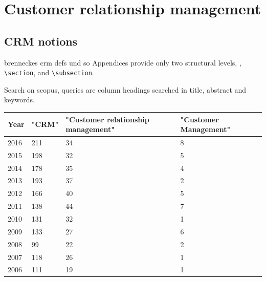\section{Customer relationship management}\label{sec:appendix01}

\subsection{CRM notions}
\label{app:crm}
brenneckes crm defs und so 
Appendices provide only two structural levels, \viz, \texttt{\textbackslash section}, and \texttt{\textbackslash subsection}.

Search on scopus, queries are column headings searched in title, abstract and keywords. 

\begin{table}[caption={CRM publication comparison}, label=tab:crmnotioncomparison]
	\centering

	\begin{tabular}{p{1cm}| p{2cm} |p{4.3cm}|p{3cm}   } 
		\textbf{Year} & \textbf{"CRM"} & \textbf{"Customer relationship management"} & \textbf{"Customer Management"} \\ \hline 
		2016          & 211            & 34                                          & 8                              \\
		2015          & 198            & 32                                          & 5                              \\
		2014          & 178            & 35                                          & 4                              \\
		2013          & 193            & 37                                          & 2                              \\
		2012          & 166            & 40                                          & 5                              \\
		2011          & 138            & 44                                          & 7                              \\
		2010          & 131            & 32                                          & 1                              \\
		2009          & 133            & 27                                          & 6                              \\
		2008          & 99             & 22                                          & 2                              \\
		2007          & 118            & 26                                          & 1                              \\
		2006 & 111          & 19                           & 1									 \\
	\end{tabular}
\end{table}

